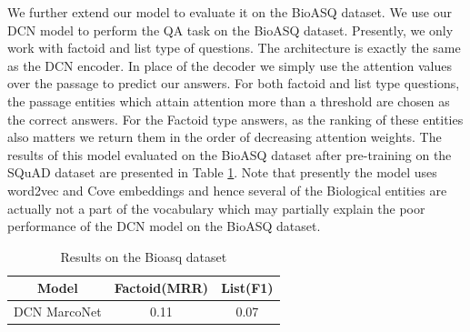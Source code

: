 We further extend our model to evaluate it on the BioASQ dataset. We use our DCN model to perform the QA task on the BioASQ dataset. Presently, we only work with factoid and list type of questions. The architecture is exactly the same as the DCN encoder. In place of the decoder we simply use the attention values over the passage to predict our answers. For both factoid and list type questions, the passage entities which attain attention more than a threshold are chosen as the correct answers. For the Factoid type answers, as the ranking of these entities also matters we return them in the order of decreasing attention weights. The results of this model evaluated on the BioASQ dataset after pre-training on the SQuAD dataset are presented in Table \ref{tab:bioasq_res}. Note that presently the model uses word2vec and Cove embeddings and hence several of the Biological entities are actually not a part of the vocabulary which may partially explain the poor performance of the DCN model on the BioASQ dataset.

\begin{table}
\centering
\begin{tabular}{|c|c|c|}
    \hline \hline
    Model & Factoid(MRR) & List(F1)\\
    \hline
    DCN MarcoNet& 0.11&0.07\\
    \hline \hline
\end{tabular}
    \caption{Results on the Bioasq dataset}
    \label{tab:bioasq_res}
\end{table}
